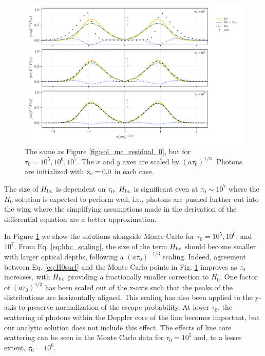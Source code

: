 \documentclass{aastex63}
\begin{document}
 \begin{figure}
    \centering
    \includegraphics{tau_threepanel.pdf}
    \caption{The same as Figure \ref{fig:sol_mc_residual_0}, but for $\tau_0 = 10^5, 10^6, 10^7$. The $x$ and $y$ axes are scaled by $(a\tau_0)^{1/3}$. Photons are initialized with $\rm x_s = 0.0$ in each case.}
    \label{fig:sol_mc_tau}
\end{figure}

The size of $H_{\rm bc}$ is dependent on $\tau_0$. $H_{\rm bc}$ is significant even at $\tau_0 {\sim} 10^7$ where the $H_0$ solution is expected to perform well, i.e., photons are pushed further out into the wing where the simplifying assumptions made in the derivation of the differential equation are a better approximation. 

In Figure \ref{fig:sol_mc_tau} we show the solutions alongside Monte Carlo for $\tau_0=10^5, 10^6$, and $10^7$. From Eq. \ref{eq:hbc_scaling}, the size of the term $H_{\rm bc}$ should become smaller with larger optical depths, following a $(a\tau_0)^{-1/3}$ scaling. Indeed, agreement between Eq. \ref{eq:H0surf} and the Monte Carlo points in Fig. \ref{fig:sol_mc_tau} improves as $\tau_0$ increases, with $H_{\rm bc}$ providing a fractionally smaller correction to $H_0$. One factor of $(a\tau_0)^{1/3}$ has been scaled out of the x-axis such that the peaks of the distributions are horizontally aligned. This scaling has also been applied to the y-axis to preserve normalization of the escape probability. At lower $\tau_0$, the scattering of photons within the Doppler core of the line becomes important, but our analytic solution does not include this effect. The effects of line core scattering can be seen in the Monte Carlo data for $\tau_0=10^5$ and, to a lesser extent, $
\tau_0=10^6$.
 
\end{document}
